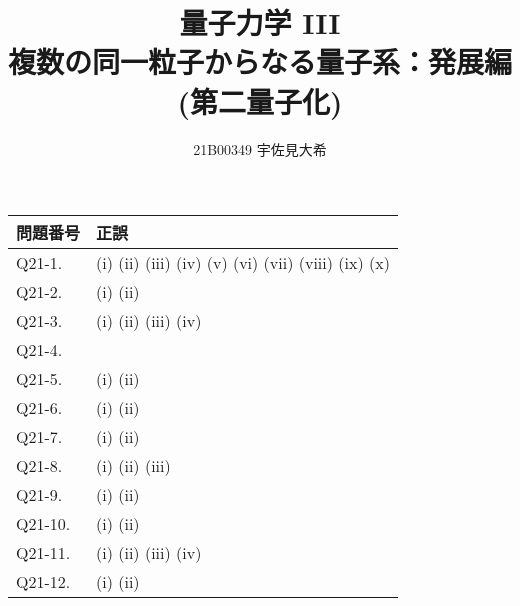 \documentclass[uplatex,dvipdfmx,a4paper,11pt]{jlreq}
\title{量子力学 III \\ 複数の同一粒子からなる量子系：発展編 (第二量子化)}
\author{21B00349 宇佐見大希}
\numberwithin{equation}{section}
\theoremstyle{definition}
\begin{document}
\maketitle
\tableofcontents
\clearpage

\begin{table}[hbtp]
  \label{table:data_type}
  \centering
  \begin{tabular}{ll}
    \hline
    問題番号    & 正誤                                                                                                             \\
    \hline \hline
    Q21-1.  & (i) \quad (ii) \quad (iii) \quad (iv) \quad (v) \quad (vi) \quad (vii) \quad (viii) \quad (ix) \quad (x) \quad \\
    Q21-2.  & (i) \quad (ii) \quad                                                                                           \\
    Q21-3.  & (i) \quad (ii) \quad (iii) \quad (iv) \quad                                                                    \\
    Q21-4.  & \quad                                                                                                          \\
    Q21-5.  & (i) \quad (ii) \quad                                                                                           \\
    Q21-6.  & (i) \quad (ii) \quad                                                                                           \\
    Q21-7.  & (i) \quad (ii) \quad                                                                                           \\
    Q21-8.  & (i) \quad (ii) \quad (iii) \quad                                                                               \\
    Q21-9.  & (i) \quad (ii) \quad                                                                                           \\
    Q21-10. & (i) \quad (ii) \quad                                                                                           \\
    Q21-11. & (i) \quad (ii) \quad (iii) \quad (iv) \quad                                                                    \\
    Q21-12. & (i) \quad (ii) \quad                                                                                           \\

\end{tabular}
\end{table}
\end{document}
